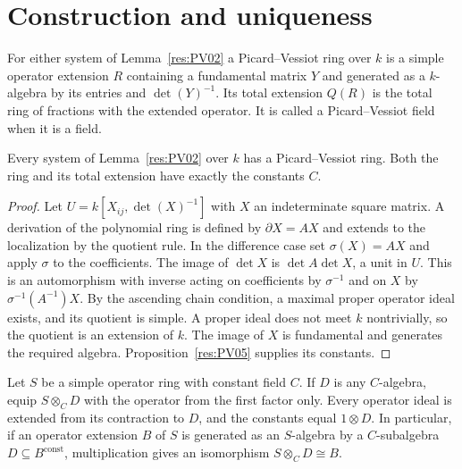 \section{Construction and uniqueness}

\begin{definition}
\label{res:PV06}
For either system of Lemma~\ref{res:PV02} a Picard--Vessiot ring
over \(k\) is a simple operator extension \(R\) containing a
fundamental matrix \(Y\) and generated as a \(k\)-algebra by its
entries and \(\det(Y)^{-1}\). Its total extension \(Q(R)\) is the
total ring of fractions with the extended operator. It is called a
Picard--Vessiot field when it is a field.
\end{definition}

\begin{theorem}
\label{res:PV07}
Every system of Lemma~\ref{res:PV02} over \(k\) has a
Picard--Vessiot ring. Both the ring and its total extension have
exactly the constants \(C\).
\end{theorem}

\begin{proof}
Let \(U=k[X_{ij},\det(X)^{-1}]\) with \(X\) an indeterminate
square matrix. A derivation of the polynomial ring is defined by
\(\partial X=AX\) and extends to the localization by the
quotient rule. In the difference case set \(\sigma(X)=AX\) and
apply \(\sigma\) to the coefficients. The image of \(\det X\) is
\(\det A\det X\), a unit in \(U\). This is an automorphism
with inverse acting on coefficients by \(\sigma^{-1}\) and on \(X\)
by \(\sigma^{-1}(A^{-1})X\).
By the ascending chain condition, a maximal proper operator
ideal exists, and its quotient is simple. A proper ideal does
not meet \(k\) nontrivially, so the quotient is an extension
of \(k\). The image of \(X\) is fundamental and generates the
required algebra. Proposition~\ref{res:PV05} supplies its constants.
\end{proof}

\begin{lemma}
\label{res:PV08}
Let \(S\) be a simple operator ring with constant field \(C\).
If \(D\) is any \(C\)-algebra, equip \(S\otimes_C D\) with the
operator from the first factor only. Every operator ideal is extended
from its contraction to \(D\), and the constants equal \(1\otimes D\).
In particular, if an operator extension \(B\) of \(S\) is generated
as an \(S\)-algebra by a \(C\)-subalgebra \(D\subseteq
B^{\mathrm{const}}\), multiplication gives an isomorphism
\(S\otimes_C D\cong B\).
\end{lemma}

